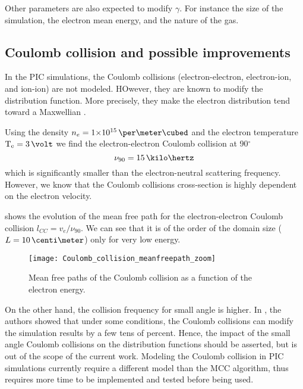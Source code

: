     Other parameters are also expected to modify $\gamma$.
    For instance the size of the simulation, the electron mean energy, and the nature of the gas.

  \subsection{Coulomb collision and possible improvements}
  
    In the \ac{PIC} simulations, the Coulomb collisions (electron-electron, electron-ion, and ion-ion) are not modeled.
    HOwever, they are known to modify the distribution function.
    More precisely, they make the electron distribution tend toward a Maxwellian \citep{bhatnagar1954,sydorenko2006b}.
    
     Using the density $n_e=\sn{1}{15}\,\per\meter\cubed$ and the electron temperature $\Te=3\,\volt$ we find the electron-electron Coulomb collision at 90$^{\circ}$ \citep{lieberman2005,chen2006}
     \begin{equation} \label{eq-nu_Coulomb}
       \nu_{90} = 15 \,\kilo\hertz
     \end{equation}
     which is significantly smaller than the electron-neutral scattering frequency.
     However, we know that the Coulomb collisions cross-section is highly dependent on the electron velocity.
     
      shows the evolution of the mean free path for the electron-electron Coulomb collision $l_{CC} = v_e/\nu_{90}$.
     We can see that it is of the order of the domain size ($L=10\,\centi\meter$) only for very low energy.
     \begin{figure}[hbt]
       \centering
       \texttt{[image: Coulomb\_collision\_meanfreepath\_zoom]}
       \caption{Mean free paths of the Coulomb collision as a function of the electron energy.}
       \label{fig-mfp_coulomb}
     \end{figure}
     
     On the other hand, the collision frequency for small angle is higher.
     In \citet{sydorenko2006b}, the authors showed that under some conditions, the Coulomb collisions can modify the simulation results by a few tens of percent.
     Hence, the impact of the small angle Coulomb collisions on the distribution functions should be asserted, but is out of the scope of the current work.
     Modeling the Coulomb collision in \ac{PIC} simulations currently require a different model than the \ac{MCC} algorithm, thus requires more time to be implemented and tested before being used.

     
